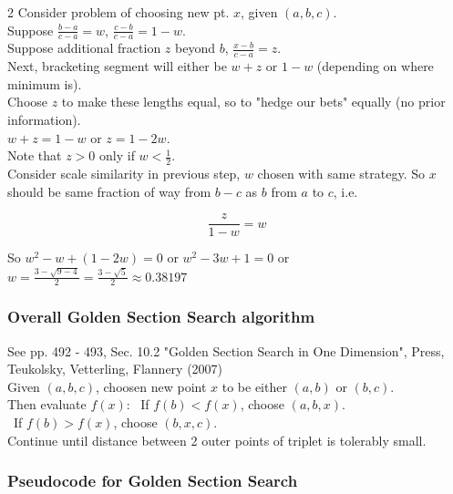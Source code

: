 \documentclass[10pt]{amsart}
\begin{document}
\begin{multicols*}{2}
Consider problem of choosing new pt. $x$, given $(a,b,c)$. \\

Suppose $\frac{b-a}{c-a} = w$, $\frac{c-b}{c-a} = 1 - w$. \\

Suppose additional fraction $z$ beyond $b$, $\frac{x-b}{c-a} = z$. \\

Next, bracketing segment will either be $w+z$ or $1-w$ (depending on where minimum is). \\

Choose $z$ to make these lengths equal, so to "hedge our bets" equally (no prior information). \\

$w+z = 1 -w$ or $z=1-2w$. \\

Note that $z>0$ only if $w< \frac{1}{2}$. \\

Consider scale similarity in previous step, $w$ chosen with same strategy. So $x$ should be same fraction of way from $b-c$ as $b$ from $a$ to $c$, i.e.

\[
\frac{z}{1-w} = w
\]

So $w^2-w + (1-2w) = 0 $ or $w^2 - 3w + 1=0$ or $w = \frac{ 3 - \sqrt{ 9 -4}}{ 2} = \frac{3 - \sqrt{5}}{2} \approx 0.38197$

\subsubsection{Overall Golden Section Search algorithm}

See pp. 492 - 493, Sec. 10.2 "Golden Section Search in One Dimension", Press, Teukolsky, Vetterling, Flannery (2007) \cite{PTVF2007} \\

Given $(a,b,c)$, choosen new point $x$ to be either $(a,b)$ or $(b,c)$. \\

Then evaluate $f(x)$:
\quad \, If $f(b) < f(x)$, choose $(a,b,x)$. \\
\quad \, If $f(b) > f(x)$, choose $(b,x,c)$. \\

Continue until distance between 2 outer points of triplet is tolerably small.

\subsubsection{Pseudocode for Golden Section Search}


\end{multicols*}
\end{document}
